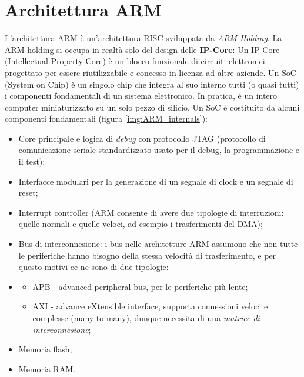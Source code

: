 \section{Architettura ARM}
L'architettura ARM è un'architettura RISC sviluppata da \textit{ARM Holding}. La ARM holding si occupa in realtà solo del design delle \textbf{IP-Core}: Un IP Core (Intellectual Property Core) è un blocco funzionale di circuiti elettronici progettato per essere riutilizzabile e concesso in licenza ad altre aziende.
Un SoC (System on Chip) è un singolo chip che integra al suo interno tutti (o quasi tutti) i componenti fondamentali di un sistema elettronico. In pratica, è un intero computer miniaturizzato su un solo pezzo di silicio. 
Un SoC è costituito da alcuni componenti fondamentali (figura \ref{img:ARM_internals}):

\begin{itemize}
    \item Core principale e logica di \textit{debug} con protocollo JTAG (protocollo di comunicazione seriale standardizzato usato per il debug, la programmazione e il test);
    \item Interfacce modulari per la generazione di un segnale di clock e un segnale di reset;
    \item Interrupt controller (ARM  consente di avere due tipologie di interruzioni: quelle normali e quelle veloci, ad esempio i trasferimenti del DMA);
    \item Bus di interconnesione: i bus nelle architetture ARM assumono che non tutte le periferiche hanno bisogno della stessa velocità di trasferimento, e per questo motivi ce ne sono di due tipologie:
    \item \begin{itemize}
        \item APB - advanced peripheral bus, per le periferiche più lente;
        \item AXI - advance eXtensible interface, supporta connessioni veloci e complesse (many to many), dunque necessita di una \textit{matrice di interconnesione};
    \end{itemize}
    \item Memoria flash;
    \item Memoria RAM.
\end{itemize}

